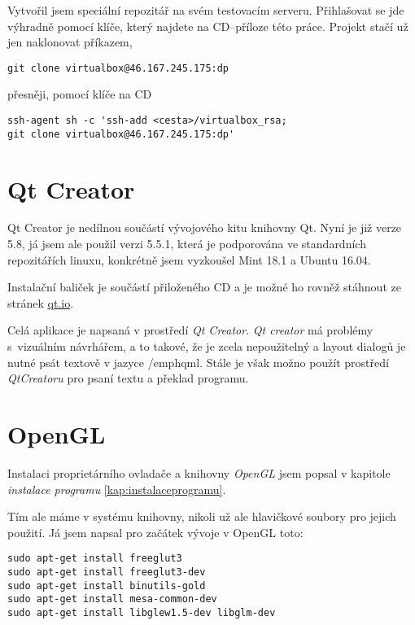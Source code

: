 Vytvořil jsem speciální repozitář na svém testovacím serveru.
Přihlašovat se jde výhradně pomocí klíče, který najdete na CD--příloze této práce. Projekt stačí už jen naklonovat příkazem,

\begin{Verbatim} 
git clone virtualbox@46.167.245.175:dp
\end{Verbatim}

přesněji, pomocí klíče na CD

\begin{Verbatim} 
ssh-agent sh -c 'ssh-add <cesta>/virtualbox_rsa;
git clone virtualbox@46.167.245.175:dp'
\end{Verbatim}


\section{Qt Creator}


Qt Creator je nedílnou součástí vývojového kitu knihovny Qt. Nyní je již verze
5.8, já jsem ale použil verzi 5.5.1, která je podporována ve standardních repozitářích linuxu, konkrétně jsem vyzkoušel Mint 18.1 a Ubuntu 16.04.

Instalační baliček je součástí přiloženého CD a je možné ho rovněž stáhnout ze stránek \url{qt.io}.


Celá aplikace je napsaná v prostředí \emph{Qt Creator}. \emph{Qt creator} má problémy s~vizuálním návrhářem, a to takové, že je zcela nepoužitelný a layout dialogů je nutné psát textově v jazyce /emph{qml}. Stále je však možno použít prostředí \emph{QtCreatoru} pro psaní textu a překlad programu.


\section{OpenGL}


Instalaci proprietárního ovladače a knihovny \emph{OpenGL} jsem popsal v kapitole \emph{instalace programu} \ref{kap:instalaceprogramu}.

Tím ale máme v systému knihovny, nikoli už ale  hlavičkové soubory pro jejich použití. Já jsem napsal pro začátek vývoje v OpenGL toto:

\begin{Verbatim} 
sudo apt-get install freeglut3
sudo apt-get install freeglut3-dev
sudo apt-get install binutils-gold
sudo apt-get install mesa-common-dev
sudo apt-get install libglew1.5-dev libglm-dev
\end{Verbatim}


